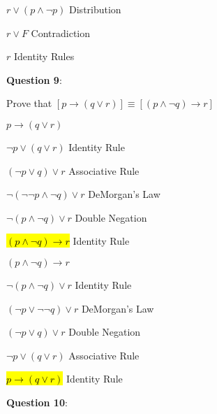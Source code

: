 \documentclass{article} %
\newcommand{\question}[2][]{\begin{flushleft}
        \textbf{Question #1}: \textit{#2}

\end{flushleft}}
\begin{document}
    $r \lor (p \land \neg p)$ \tabto*{5cm} Distribution
    
    $r \lor F$ \tabto*{5cm} Contradiction
    
    $r$ \tabto*{5cm} Identity Rules

    \question[9]{}

    Prove that $[p \rightarrow (q \lor r)] \equiv [(p \land \neg q) \rightarrow r]$

    \hspace{0cm}

    $p \rightarrow (q \lor r)$

    $\neg p \lor (q \lor r)$ \tabto*{3.5cm} Identity Rule
    
    $(\neg p \lor q) \lor r$ \tabto*{3.5cm} Associative Rule

    $\neg (\neg \neg p \land \neg q) \lor r$ \tabto*{3.5cm} DeMorgan's Law

    $\neg (p \land \neg q) \lor r$ \tabto*{3.5cm} Double Negation

    \hl{$(p \land \neg q) \rightarrow r$} \tabto*{3.5cm} Identity Rule

    \hspace{0cm}

    $(p \land \neg q) \rightarrow r$

    $\neg(p \land \neg q) \lor r$ \tabto*{3.5cm} Identity Rule

    $(\neg p \lor \neg \neg q) \lor r$ \tabto*{3.5cm} DeMorgan's Law

    $(\neg p \lor q) \lor r$ \tabto*{3.5cm} Double Negation

    $\neg p \lor (q \lor r)$ \tabto*{3.5cm} Associative Rule

    \hl{$p \rightarrow (q \lor r)$} \tabto*{3.5cm} Identity Rule

    \question[10]{}
\end{document}
